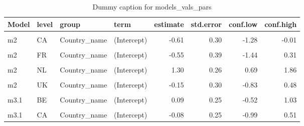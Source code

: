 \begin{table}
\centering
\caption{Dummy caption for models_vals_pars}
\centering
\fontsize{10}{12}\selectfont
\begin{tabular}[t]{llllrrrr}
\toprule
Model & level & group & term & estimate & std.error & conf.low & conf.high\\
\midrule
\cellcolor{gray!10}{m2} & \cellcolor{gray!10}{BE} & \cellcolor{gray!10}{Country\_name} & \cellcolor{gray!10}{(Intercept)} & \cellcolor{gray!10}{0.67} & \cellcolor{gray!10}{0.27} & \cellcolor{gray!10}{0.09} & \cellcolor{gray!10}{1.25}\\
m2 & CA & Country\_name & (Intercept) & -0.61 & 0.30 & -1.28 & -0.01\\
\cellcolor{gray!10}{m2} & \cellcolor{gray!10}{CH} & \cellcolor{gray!10}{Country\_name} & \cellcolor{gray!10}{(Intercept)} & \cellcolor{gray!10}{0.05} & \cellcolor{gray!10}{0.36} & \cellcolor{gray!10}{-0.72} & \cellcolor{gray!10}{0.82}\\
m2 & FR & Country\_name & (Intercept) & -0.55 & 0.39 & -1.44 & 0.31\\
\cellcolor{gray!10}{m2} & \cellcolor{gray!10}{IL} & \cellcolor{gray!10}{Country\_name} & \cellcolor{gray!10}{(Intercept)} & \cellcolor{gray!10}{-0.21} & \cellcolor{gray!10}{0.60} & \cellcolor{gray!10}{-1.56} & \cellcolor{gray!10}{1.08}\\
m2 & NL & Country\_name & (Intercept) & 1.30 & 0.26 & 0.69 & 1.86\\
\cellcolor{gray!10}{m2} & \cellcolor{gray!10}{SE} & \cellcolor{gray!10}{Country\_name} & \cellcolor{gray!10}{(Intercept)} & \cellcolor{gray!10}{-0.37} & \cellcolor{gray!10}{0.32} & \cellcolor{gray!10}{-1.08} & \cellcolor{gray!10}{0.32}\\
m2 & UK & Country\_name & (Intercept) & -0.15 & 0.30 & -0.83 & 0.48\\
\cellcolor{gray!10}{m2} & \cellcolor{gray!10}{US} & \cellcolor{gray!10}{Country\_name} & \cellcolor{gray!10}{(Intercept)} & \cellcolor{gray!10}{-0.14} & \cellcolor{gray!10}{0.29} & \cellcolor{gray!10}{-0.80} & \cellcolor{gray!10}{0.48}\\
m3.1 & BE & Country\_name & (Intercept) & 0.09 & 0.25 & -0.52 & 1.03\\
\cellcolor{gray!10}{m3.1} & \cellcolor{gray!10}{BE} & \cellcolor{gray!10}{Country\_name} & \cellcolor{gray!10}{EPS} & \cellcolor{gray!10}{0.18} & \cellcolor{gray!10}{0.13} & \cellcolor{gray!10}{-0.12} & \cellcolor{gray!10}{0.47}\\
m3.1 & CA & Country\_name & (Intercept) & -0.08 & 0.25 & -0.99 & 0.51\\

\end{tabular}
\end{table}
